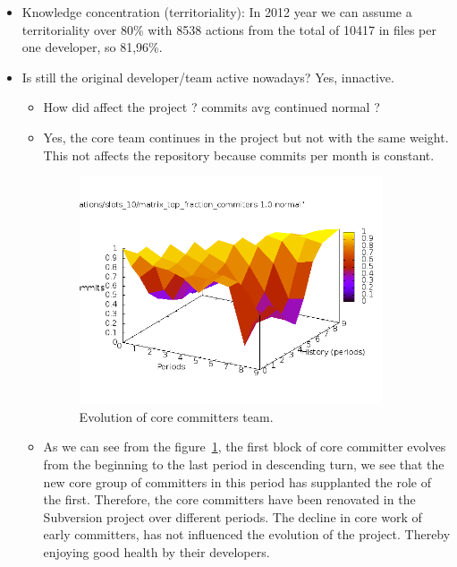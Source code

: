 \documentclass[11pt]{scrartcl}
\begin{document}
\begin{itemize}
\begin{itemize}
    \end{itemize}
	    \item Knowledge concentration (territoriality): In 2012 year we can assume a territoriality over 80\% with 8538 actions from the total of 10417 in files per one developer, so 81,96\%.
    \item Is still the original developer/team active nowadays? Yes, innactive.
    \begin{itemize}
        \item How did affect the project ? commits avg continued normal ?
        \item Yes, the core team continues in the project but not with the same weight. This not affects the repository because commits per month is constant.

            \begin{figure}[H]
            \begin{center}
              \includegraphics[width=0.9\textwidth]{libcsvanaly2/generations/matrix-top-fraction-commiters-1-0-normal.png}
              \caption{Evolution of core committers team.}
              \label{fig:core-committers-evolution}
            \end{center}
            \end{figure}
        \item As we can see from the figure~\ref{fig:core-committers-evolution}, the first block of core committer evolves from the beginning to the last period in descending turn, we see that the new core group of committers in this period has supplanted the role of the first. Therefore, the core committers have been renovated in the Subversion project over different periods. The decline in core work of early committers, has not influenced the evolution of the project. Thereby enjoying good health by their developers.
    \end{itemize}
\end{itemize}
\end{document}
